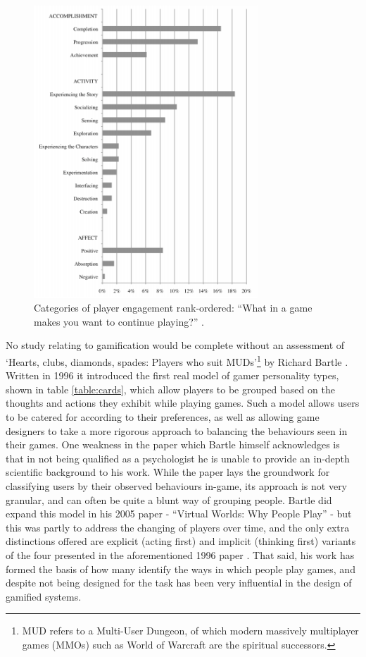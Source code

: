 \documentclass[12pt,a4paper,twoside]{report}
\begin{document}
\begin{figure}
\begin{center}
	\includegraphics[width=0.75\textwidth]{../img/fog.png}
	\caption{Categories of player engagement rank-ordered: ``What in a game makes you want to continue playing?'' \cite{schoenau2011player}.}
	\label{fog}
\end{center}
\end{figure}

No study relating to gamification would be complete without an assessment of `Hearts, clubs, diamonds, spades: Players who suit MUDs'\footnote{MUD refers to a Multi-User Dungeon, of which modern massively multiplayer games (MMOs) such as World of Warcraft are the spiritual successors.} by Richard Bartle \cite{bartle1996hearts}. Written in 1996 it introduced the first real model of gamer personality types, shown in table \ref{table:cards}, which allow players to be grouped based on the thoughts and actions they exhibit while playing games. Such a model allows users to be catered for according to their preferences, as well as allowing game designers to take a more rigorous approach to balancing the behaviours seen in their games.  One weakness in the paper which Bartle himself acknowledges is that in not being qualified as a psychologist he is unable to provide an in-depth scientific background to his work. While the paper lays the groundwork for classifying users by their observed behaviours in-game, its approach is not very granular, and can often be quite a blunt way of grouping people. Bartle did expand this model in his 2005 paper - ``Virtual Worlds: Why People Play'' \cite{bartle2005play} - but this was partly to address the changing of players over time, and the only extra distinctions offered are explicit (acting first) and implicit (thinking first) variants of the four presented in the aforementioned 1996 paper \cite{bartle2005play}. That said, his work has formed the basis of how many identify the ways in which people play games, and despite not being designed for the task has been very influential in the design of gamified systems.
\end{document}
